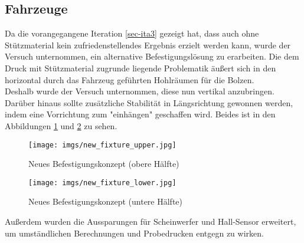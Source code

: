 \documentclass[.../Dokumentation.tex]{subfiles}
\begin{document}
\subsection{Fahrzeuge}\label{sec-ita4-cars}
Da die vorangegangene Iteration \ref{sec-ita3} gezeigt hat, dass auch ohne 
Stützmaterial kein zufriedenstellendes Ergebnis erzielt werden kann, 
wurde der Versuch unternommen, ein alternative Befestigungslösung zu erarbeiten. 
Die dem Druck mit Stützmaterial zugrunde liegende Problematik äußert sich in 
den horizontal durch das Fahrzeug geführten Hohlräumen für die Bolzen.\\
Deshalb wurde der Versuch unternommen, diese nun vertikal anzubringen.
Darüber hinaus sollte zusätzliche Stabilität in Längsrichtung gewonnen werden, 
indem eine Vorrichtung zum "einhängen" geschaffen wird. 
Beides ist in den Abbildungen \ref{fig-new-fixture-upper} und 
\ref{fig-new-fixture-lower} zu sehen.
\begin{figure}[H]
\begin{center}
    \texttt{[image: imgs/new\_fixture\_upper.jpg]}
    \caption{Neues Befestigungskonzept (obere Hälfte)}
    \label{fig-new-fixture-upper}
\end{center}
\end{figure}
\noindent
\begin{figure}[H]
\begin{center}
    \texttt{[image: imgs/new\_fixture\_lower.jpg]}
    \caption{Neues Befestigungskonzept (untere Hälfte)}
    \label{fig-new-fixture-lower}
\end{center}
\end{figure}
\noindent 
Außerdem wurden die Aussparungen für Scheinwerfer und Hall-Sensor erweitert, 
um umständlichen Berechnungen und Probedrucken entgegn zu wirken.
\end{document}
